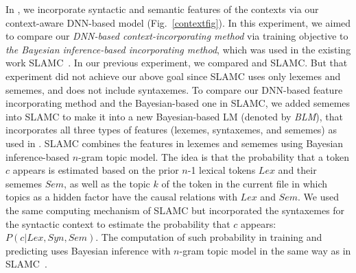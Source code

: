 In {\tool}, we incorporate syntactic and semantic features of the
contexts 
via our context-aware DNN-based model
(Fig.~\ref{contextfig}).
In this experiment, we aimed to compare our {\em DNN-based
context-incorporating method} via training objective to {\em the
Bayesian inference-based incorporating method}, which was used in the
existing work SLAMC~\cite{fse13}. In our previous experiment, we
compared {\tool} and SLAMC. But that experiment did not achieve our
above goal since SLAMC uses only lexemes and sememes, and does not
include syntaxemes. To compare our DNN-based feature incorporating
method and the Bayesian-based one in SLAMC, we added sememes
into SLAMC to make it into a new Bayesian-based LM (denoted by {\em
BLM}), that incorporates all three types of features (lexemes,
syntaxemes, and sememes) as used in {\tool}.
%
%
SLAMC combines the features in lexemes and sememes using Bayesian
inference-based $n$-gram topic model. The idea is that
the probability that a token $c$ appears is estimated based on the
prior $n$-1 lexical tokens $Lex$ and their sememes $Sem$, as well as
the topic $k$ of the token in the current file in which topics as
a hidden factor have the causal relations with $Lex$ and $Sem$. We
used the same computing mechanism of SLAMC but incorporated the
syntaxemes for the syntactic context to estimate the probability that
$c$ appears: $P(c|Lex,Syn,Sem)$. The computation of such
probability in training and predicting uses Bayesian
inference with $n$-gram topic model in the same way as in
SLAMC~\cite{fse13}.
 

